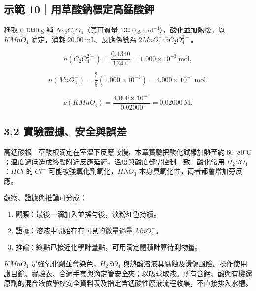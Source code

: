\documentclass[11pt,a4paper]{article}
\providecommand{\tightlist}{%
  \setlength{\itemsep}{0pt}\setlength{\parskip}{0pt}}
\begin{document}
\begin{HandoutWorkedExample}

\subsection{示範 10｜用草酸鈉標定高錳酸鉀}\label{ux793aux7bc4-10ux7528ux8349ux9178ux9209ux6a19ux5b9aux9ad8ux9333ux9178ux9240}

稱取 \(0.1340\ \mathrm g\) 純 \(Na_2C_2O_4\)（莫耳質量 \(134.0\ \mathrm{g\,mol^{-1}}\)），酸化並加熱後，以 \(KMnO_4\) 滴定，消耗 \(20.00\ \mathrm{mL}\)。反應係數為 \(2MnO_4^-:5C_2O_4^{2-}\)。

\[
n(C_2O_4^{2-})=\frac{0.1340}{134.0}=1.000\times10^{-3}\ \mathrm{mol},
\]

\[
n(MnO_4^-)=\frac25(1.000\times10^{-3})=4.000\times10^{-4}\ \mathrm{mol}.
\]

\[
c(KMnO_4)=\frac{4.000\times10^{-4}}{0.02000}=0.02000\ \mathrm M.
\]

\end{HandoutWorkedExample}

\subsection{3.2 實驗證據、安全與誤差}\label{ux5be6ux9a57ux8b49ux64daux5b89ux5168ux8207ux8aa4ux5dee}

高錳酸根---草酸根滴定在室溫下反應較慢，本章實驗把酸化試樣加熱至約 \(60\)--\(80^\circ\mathrm C\)；溫度過低造成終點附近反應延遲，溫度與酸度都需控制一致。酸化常用 \(H_2SO_4\)：\(HCl\) 的 \(Cl^-\) 可能被強氧化劑氧化，\(HNO_3\) 本身具氧化性，兩者都會增加旁反應。

觀察、證據與推論可分成：

\begin{enumerate}
\def\labelenumi{\arabic{enumi}.}
\tightlist
\item
  觀察：最後一滴加入並搖勻後，淡粉紅色持續。
\item
  證據：溶液中開始存在可見的微量過量 \(MnO_4^-\)。
\item
  推論：終點已接近化學計量點，可用滴定體積計算待測物量。
\end{enumerate}

\(KMnO_4\) 是強氧化劑並會染色，\(H_2SO_4\) 與熱酸溶液具腐蝕及燙傷風險。操作使用護目鏡、實驗衣、合適手套與滴定管安全夾；以吸球取液。所有含錳、酸與有機還原劑的混合液依學校安全資料表及指定含錳酸性廢液流程收集，不直接排入水槽。
\end{document}
